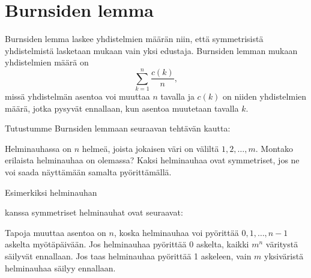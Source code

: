 \section{Burnsiden lemma}


Burnsiden lemma laskee yhdistelmien määrän niin,
että symmetrisistä yhdistelmistä lasketaan
mukaan vain yksi edustaja.
Burnsiden lemman mukaan yhdistelmien määrä on
\[\sum_{k=1}^n \frac{c(k)}{n},\]
missä yhdistelmän asentoa voi muuttaa $n$ tavalla
ja $c(k)$ on niiden yhdistelmien määrä,
jotka pysyvät ennallaan, kun asentoa
muutetaan tavalla $k$.

Tutustumme Burnsiden lemmaan seuraavan tehtävän kautta:

\begin{task}
Helminauhassa on $n$ helmeä,
joista jokaisen väri on väliltä $1,2,\ldots,m$.
Montako erilaista helminauhaa on olemassa?
Kaksi helminauhaa ovat symmetriset,
jos ne voi saada näyttämään samalta pyörittämällä.
\end{task}

\noindent
Esimerkiksi helminauhan
\begin{center}
\end{center}
kanssa symmetriset helminauhat ovat seuraavat:
\begin{center}
\end{center}
Tapoja muuttaa asentoa on $n$,
koska helminauhaa voi pyörittää $0,1,\ldots,n-1$
askelta myötäpäivään.
Jos helminauhaa pyörittää 0 askelta,
kaikki $m^n$ väritystä säilyvät ennallaan.
Jos taas helminauhaa pyörittää 1 askeleen,
vain $m$ yksiväristä helminauhaa säilyy ennallaan.

